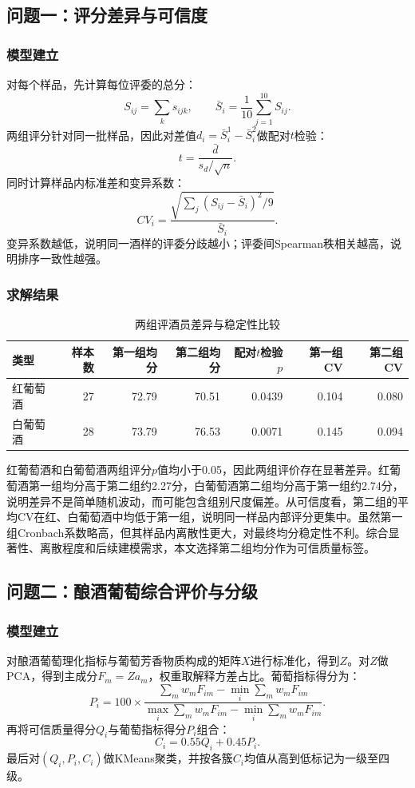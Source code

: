 \documentclass[UTF8,a4paper,12pt]{ctexart}
\begin{document}
\subsection{问题一：评分差异与可信度}
\subsubsection{模型建立}
对每个样品，先计算每位评委的总分：
\begin{equation}S_{ij}=\sum_k s_{ijk},\qquad \bar S_i=\frac1{10}\sum_{j=1}^{10}S_{ij}.\end{equation}
两组评分针对同一批样品，因此对差值$d_i=\bar S_i^1-\bar S_i^2$做配对$t$检验：
\begin{equation}t=\frac{\bar d}{s_d/\sqrt n}.\end{equation}
同时计算样品内标准差和变异系数：
\begin{equation}CV_i=\frac{\sqrt{\sum_j(S_{ij}-\bar S_i)^2/9}}{\bar S_i}.\end{equation}
变异系数越低，说明同一酒样的评委分歧越小；评委间Spearman秩相关越高，说明排序一致性越强。
\subsubsection{求解结果}
\begin{table}[H]\centering\caption{两组评酒员差异与稳定性比较}\begin{tabular}{lrrrrrr}\toprule 类型 & 样本数 & 第一组均分 & 第二组均分 & 配对$t$检验$p$ & 第一组CV & 第二组CV\\\midrule
红葡萄酒 & 27 & 72.79 & 70.51 & 0.0439 & 0.104 & 0.080 \\
白葡萄酒 & 28 & 73.79 & 76.53 & 0.0071 & 0.145 & 0.094 \\
\bottomrule\end{tabular}\end{table}
红葡萄酒和白葡萄酒两组评分$p$值均小于0.05，因此两组评价存在显著差异。红葡萄酒第一组均分高于第二组约2.27分，白葡萄酒第二组均分高于第一组约2.74分，说明差异不是简单随机波动，而可能包含组别尺度偏差。从可信度看，第二组的平均CV在红、白葡萄酒中均低于第一组，说明同一样品内部评分更集中。虽然第一组Cronbach系数略高，但其样品内离散性更大，对最终均分稳定性不利。综合显著性、离散程度和后续建模需求，本文选择第二组均分作为可信质量标签。
\subsection{问题二：酿酒葡萄综合评价与分级}
\subsubsection{模型建立}
对酿酒葡萄理化指标与葡萄芳香物质构成的矩阵$X$进行标准化，得到$Z$。对$Z$做PCA，得到主成分$F_m=Za_m$，权重取解释方差占比。葡萄指标得分为：
\begin{equation}P_i=100\times\frac{\sum_m w_mF_{im}-\min_i\sum_mw_mF_{im}}{\max_i\sum_mw_mF_{im}-\min_i\sum_mw_mF_{im}}.\end{equation}
再将可信质量得分$Q_i$与葡萄指标得分$P_i$组合：
\begin{equation}C_i=0.55Q_i+0.45P_i.\end{equation}
最后对$(Q_i,P_i,C_i)$做KMeans聚类，并按各簇$C_i$均值从高到低标记为一级至四级。
\end{document}
